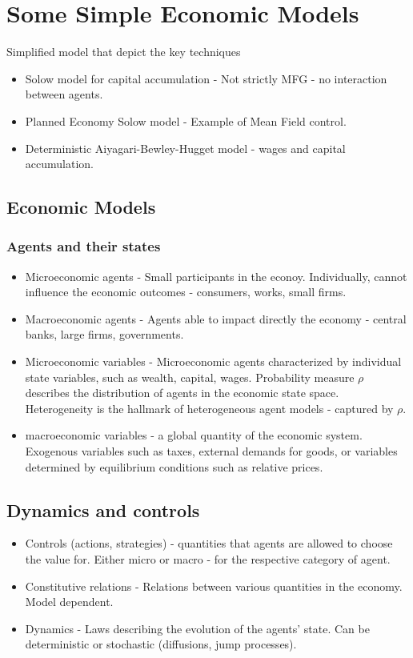 \documentclass{article}
\begin{document}
\section{Some Simple Economic Models}
Simplified model that depict the key techniques
\begin{itemize}
    \item Solow model for capital accumulation - Not strictly MFG - no interaction between agents.
    \item Planned Economy Solow model - Example of Mean Field control.
    \item Deterministic Aiyagari-Bewley-Hugget model - wages and capital accumulation.
\end{itemize}

\subsection{Economic Models}
\subsubsection[]{Agents and their states}

\begin{itemize}
    \item Microeconomic agents - Small participants in the econoy. Individually, cannot influence the economic
    outcomes - consumers, works, small firms.
    \item Macroeconomic agents - Agents able to impact directly the economy - central banks, large firms, governments.
    \item Microeconomic variables - Microeconomic agents characterized by individual state variables,
    such as wealth, capital, wages. Probability measure $\rho$ describes the distribution of agents
    in the economic state space. Heterogeneity is the hallmark of heterogeneous agent models - captured by $\rho$.
    \item macroeconomic variables - a global quantity of the economic system. Exogenous variables such as 
    taxes, external demands for goods, or variables determined by equilibrium conditions such as relative prices.
\end{itemize}

\subsection[]{Dynamics and controls}

\begin{itemize}
    \item Controls (actions, strategies) - quantities that agents are allowed to choose the value for. 
    Either micro or macro - for the respective category of agent.
    \item Constitutive relations - Relations between various quantities in the economy. Model dependent.
    \item Dynamics - Laws describing the evolution of the agents' state. Can be deterministic or stochastic
     (diffusions, jump processes). 
\end{itemize}
\end{document}

